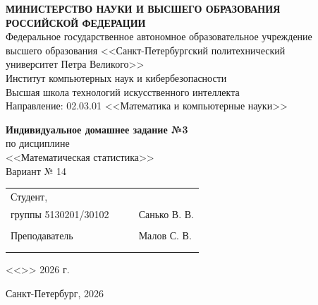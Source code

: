 \documentclass[12pt,a4paper]{article}
\begin{document}
	
	\thispagestyle{empty}
	\begin{titlepage}
		\begin{center}
			\textbf{МИНИСТЕРСТВО НАУКИ И ВЫСШЕГО ОБРАЗОВАНИЯ\\
				РОССИЙСКОЙ ФЕДЕРАЦИИ}\\[6pt]
			Федеральное государственное автономное образовательное учреждение\\
			высшего образования <<Санкт-Петербургский политехнический\\
			университет Петра Великого>>\\[6pt]
			Институт компьютерных наук и кибербезопасности\\
			Высшая школа технологий искусственного интеллекта\\[6pt]
			Направление: 02.03.01 <<Математика и компьютерные науки>>
			
			\vfill
			
			{\large\textbf{Индивидуальное домашнее задание №3}}\\[6pt]
			по дисциплине\\[4pt]
			{\large <<Математическая статистика>>}\\[12pt]
			{\large Вариант №{} 14}
			
			\vfill
			
			\small{
				\begin{tabular}{lrrl}
					\!\!\!Студент, & \hspace{2cm} & & \\
					\!\!\!группы 5130201/30102 & \hspace{2cm} & \underline{\hspace{3cm}} & Санько В. В. \\\\
					\!\!\!Преподаватель & \hspace{2cm} & \underline{\hspace{3cm}} & Малов С. В. \\\\
					&&\hspace{4cm}
				\end{tabular}
				\begin{flushright}
					<<\underline{\hspace{1cm}}>>\underline{\hspace{2.5cm}} 2026 г.
				\end{flushright}
			}
			
			\hfill\break
			\begin{center}\small{Санкт-Петербург, 2026}\end{center}
		\end{center}
	\end{titlepage}
	
\end{document}
